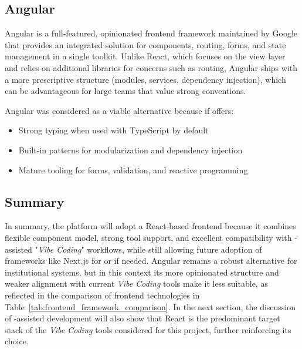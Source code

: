         \subsection{Angular}
            {
                Angular is a full-featured, opinionated frontend framework maintained by Google that provides an integrated solution for components,
                routing, forms, and state management in a single toolkit. 
                Unlike React, which focuses on the view layer and relies on additional libraries for concerns such as routing, Angular ships with a more
                prescriptive structure (modules, services, dependency injection), which can be advantageous for large teams that value strong conventions.
            }

            {
                Angular was considered as a viable alternative because if offers:
            }
            \begin{itemize}
                \item {Strong typing when used with TypeScript by default}
                \item {Built-in patterns for modularization and dependency injection}
                \item {Mature tooling for forms, validation, and reactive programming}
            \end{itemize}

        \subsection*{Summary}
            {
                In summary, the platform will adopt a React-based frontend because it combines flexible component model, 
                strong tool support, and excellent compatibility with -assisted "\textit{Vibe Coding}" workflows, while
                still allowing future adoption of frameworks like Next.js for  or  if needed. 
                Angular remains a robust alternative for institutional systems, but in this context its more opinionated structure and weaker
                alignment with current \textit{Vibe Coding} tools make it less suitable, as reflected in the comparison of frontend technologies
                in Table~\ref{tab:frontend_framework_comparison}.
                In the next section, the discussion of -assisted development will also show that React is the predominant target stack of the
                \textit{Vibe Coding} tools considered for this project, further reinforcing its choice.
            }
        
